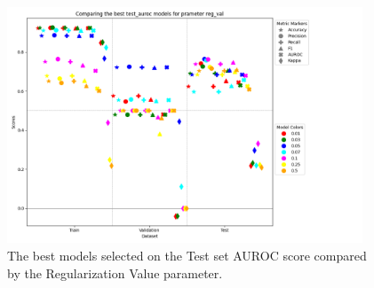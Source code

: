 \begin{figure}[H]
    \centering
    \includegraphics[width=400px]{Figures/results/reg_val/reg_val_test_auroc.png}
    \caption{The best models selected on the Test set AUROC score compared by the Regularization Value parameter.}
    \label{fig: reg_val_test_auroc}
\end{figure}


